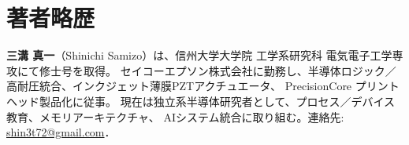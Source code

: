 \documentclass[conference]{IEEEtran}
\begin{document}
\section*{著者略歴}
\textbf{三溝 真一}（Shinichi Samizo）は、信州大学大学院 工学系研究科 電気電子工学専攻にて修士号を取得。
セイコーエプソン株式会社に勤務し、半導体ロジック／高耐圧統合、インクジェット薄膜PZTアクチュエータ、
PrecisionCore プリントヘッド製品化に従事。
現在は独立系半導体研究者として、プロセス／デバイス教育、メモリアーキテクチャ、
AIシステム統合に取り組む。連絡先: \href{mailto:shin3t72@gmail.com}{shin3t72@gmail.com}．
\end{document}
